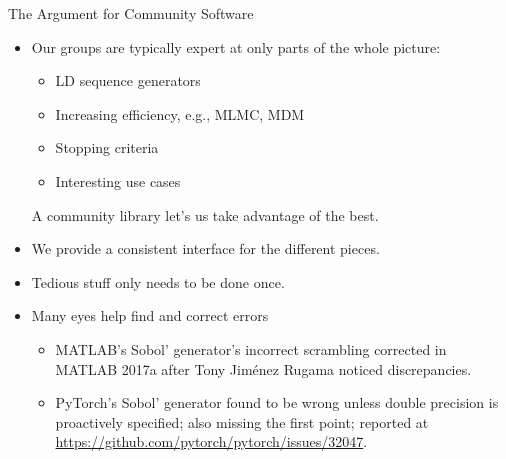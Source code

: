 \documentclass[11pt,compress,xcolor={usenames,dvipsnames},aspectratio=169]{beamer}
\begin{document}
\begin{frame}{The Argument for Community Software}
	
	\vspace{-4ex}
	
	\begin{itemize}
	\item<1-> Our groups are typically expert at only parts of the whole picture:
			\begin{itemize}
			\item LD sequence generators
			
			\item Increasing efficiency, e.g., MLMC, MDM
			
			\item Stopping criteria
			
			\item Interesting use cases
		\end{itemize}
	
		A community library let's us take advantage of the best.

	\item<2-> We provide a consistent interface for the different pieces.
	
	\item<3-> Tedious stuff only needs to be done once.

		\item<4-> Many eyes help find and correct errors
		\begin{itemize}
			\item MATLAB's Sobol' generator's incorrect scrambling corrected in MATLAB 2017a after Tony Jim\'enez Rugama noticed discrepancies.
			
			\item PyTorch's Sobol' generator found to be wrong unless double precision is proactively specified; also missing the first point; reported at \url{https://github.com/pytorch/pytorch/issues/32047}.
		\end{itemize}
	

\end{itemize}
\end{frame}
\end{document}
